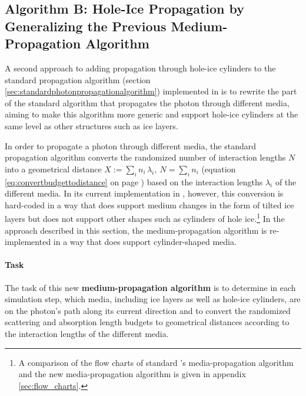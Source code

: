 
\subsection{Algorithm B: Hole-Ice Propagation by Generalizing the Previous Medium-Propagation Algorithm}
\label{sec:algorithm_b}


A second approach to adding propagation through hole-ice cylinders to the standard propagation algorithm (section \ref{sec:standardphotonpropagationalgorithm}) implemented in \clsim is to rewrite the part of the standard algorithm that propagates the photon through different media, aiming to make this algorithm more generic and support hole-ice cylinders at the same level as other structures such as ice layers.


In order to propagate a photon through different media, the standard propagation algorithm converts the randomized number of interaction lengths $N$ into a geometrical distance $X:=\sum_i n_i\,\lambda_i,\ N = \sum_i n_i$ (equation \ref{eq:convertbudgettodistance} on page \pageref{eq:convertbudgettodistance}) based on the interaction lengths $\lambda_i$ of the different media. In its current implementation in \clsim, however, this conversion is hard-coded in a way that does support medium changes in the form of tilted ice layers but does not support other shapes such as cylinders of hole ice.\footnote{A comparison of the flow charts of standard \clsim's media-propagation algorithm and the new media-propagation algorithm is given in appendix \ref{sec:flow_charts}.}
In the approach described in this section, the medium-propagation algorithm is re-implemented in a way that does support cylinder-shaped media.

\paragraph{Task}
The task of this new \textbf{medium-propagation algorithm} is to determine in each simulation step, which media, including ice layers as well as hole-ice cylinders, are on the photon's path along its current direction and to convert the randomized scattering and absorption length budgets to geometrical distances according to the interaction lengths of the different media.


